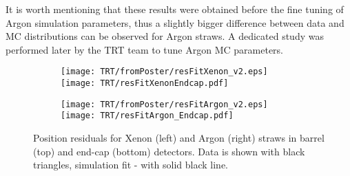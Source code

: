 It is worth mentioning that these results were obtained before the fine tuning of Argon simulation parameters, thus a slightly bigger difference between 
data and MC distributions can be observed for Argon straws. A dedicated study was performed later by the TRT team to tune Argon MC parameters.

\begin{figure}

\begin{subfigure}{.5\textwidth}
  \centering
  \texttt{[image: TRT/fromPoster/resFitXenon\_v2.eps]}
  \texttt{[image: TRT/resFitXenonEndcap.pdf]}
\end{subfigure}%
\begin{subfigure}{.5\textwidth}
  \centering
  \texttt{[image: TRT/fromPoster/resFitArgon\_v2.eps]}
  \texttt{[image: TRT/resFitArgon\_Endcap.pdf]}
\end{subfigure}

\caption{Position residuals for Xenon (left) and Argon (right) straws in barrel (top) and end-cap (bottom) detectors. Data is shown with black triangles, 
simulation fit - with solid black line.}
  \label{fig:resFit}
\end{figure}


